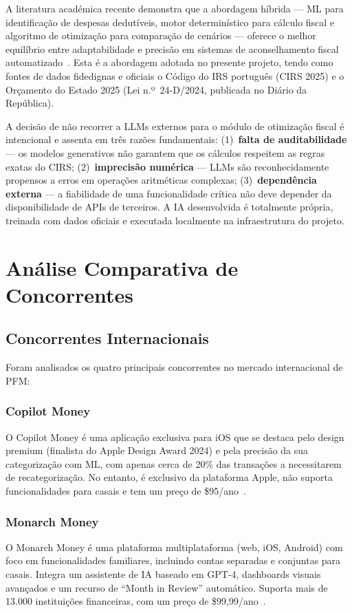 A literatura académica recente demonstra que a abordagem híbrida --- \ac{ML} para identificação de despesas dedutíveis, motor determinístico para cálculo fiscal e algoritmo de otimização para comparação de cenários --- oferece o melhor equilíbrio entre adaptabilidade e precisão em sistemas de aconselhamento fiscal automatizado~\cite{hybrid-tax-ai2024}. Esta é a abordagem adotada no presente projeto, tendo como fontes de dados fidedignas e oficiais o Código do IRS português (\ac{CIRS} 2025) e o Orçamento do Estado 2025 (Lei n.º~24-D/2024, publicada no Diário da República).

A decisão de não recorrer a \ac{LLM}s externos para o módulo de otimização fiscal é intencional e assenta em três razões fundamentais: (1)~\textbf{falta de auditabilidade} --- os modelos generativos não garantem que os cálculos respeitem as regras exatas do \ac{CIRS}; (2)~\textbf{imprecisão numérica} --- \ac{LLM}s são reconhecidamente propensos a erros em operações aritméticas complexas; (3)~\textbf{dependência externa} --- a fiabilidade de uma funcionalidade crítica não deve depender da disponibilidade de \ac{API}s de terceiros. A IA desenvolvida é totalmente própria, treinada com dados oficiais e executada localmente na infraestrutura do projeto.


\section{Análise Comparativa de Concorrentes}
\label{sec:ea-concorrentes}

\subsection{Concorrentes Internacionais}

Foram analisados os quatro principais concorrentes no mercado internacional de \ac{PFM}:

\subsubsection{Copilot Money}
O Copilot Money é uma aplicação exclusiva para iOS que se destaca pelo design premium (finalista do Apple Design Award 2024) e pela precisão da sua categorização com \ac{ML}, com apenas cerca de 20\% das transações a necessitarem de recategorização. No entanto, é exclusivo da plataforma Apple, não suporta funcionalidades para casais e tem um preço de \$95/ano~\cite{copilot2024}.

\subsubsection{Monarch Money}
O Monarch Money é uma plataforma multiplataforma (web, iOS, Android) com foco em funcionalidades familiares, incluindo contas separadas e conjuntas para casais. Integra um assistente de \ac{IA} baseado em GPT-4, dashboards visuais avançados e um recurso de ``Month in Review'' automático. Suporta mais de 13.000 instituições financeiras, com um preço de \$99,99/ano~\cite{monarch2024}.

